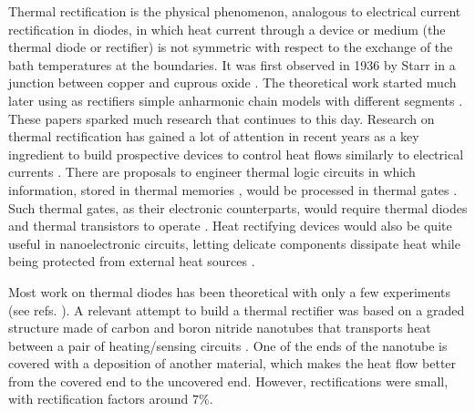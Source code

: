 Thermal rectification is the physical phenomenon, analogous to electrical current rectification in diodes, in which heat current through a device or medium (the thermal diode or rectifier) is not symmetric with respect to the exchange of the bath temperatures at the boundaries. It was  first observed in 1936 by Starr in a junction between copper and cuprous oxide \cite{Starr1936}. The theoretical work started much later using as rectifiers simple anharmonic chain models
with different segments \cite{Terraneo2002,Li2004}. These papers sparked much research that continues to this day. Research on thermal rectification has gained a lot of attention in recent years as a key ingredient to build prospective devices to control heat flows similarly to electrical currents \cite{Roberts2011,Li2012}. There are  proposals to engineer thermal logic circuits \cite{Ye2017} in which information, stored in thermal memories \cite{Wang2008}, would be processed in thermal gates \cite{Wang2007}. Such thermal gates, as their electronic counterparts,  would require thermal diodes and thermal transistors to operate \cite{Li2006,Joulain2016}.
Heat rectifying devices would also be quite useful in nanoelectronic circuits, letting delicate components dissipate heat while being protected from external heat sources \cite{Roberts2011}.

Most work on thermal diodes has been theoretical with only a few experiments (see refs. \cite{Chang2006,Kobayashi2009,Leitner2013,Elzouka2017}).
A relevant attempt to build a thermal rectifier was based on a graded structure made of carbon and boron nitride nanotubes that transports heat between a pair of heating/sensing circuits \cite{Chang2006}. One of the ends of the nanotube is covered with a deposition of another material, which makes the heat flow better from the covered end to the uncovered end. However, rectifications were small, with rectification factors around $7\%$.

